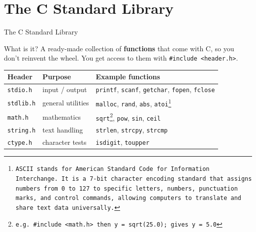 \documentclass[aspectratio=169]{beamer}
\begin{document}
	\section{The C Standard Library}
	\begin{frame}{The C Standard Library}
		\vspace*{-0.3cm}
		\begin{block}{What is it?}
			A ready-made collection of \textbf{functions} that come with C, so you don't reinvent the wheel.
			You get access to them with \texttt{\#include <header.h>}.
		\end{block}
		\renewcommand{\arraystretch}{1.2}
		\centering
		\begin{tabular}{@{}llp{6.9cm}@{}}
			\toprule
			\textbf{Header} & \textbf{Purpose} & \textbf{Example functions} \\
			\midrule
			\texttt{stdio.h}  & input / output      & \texttt{printf}, \texttt{scanf}, \texttt{getchar}, \texttt{fopen}, \texttt{fclose} \\
			\texttt{stdlib.h} & general utilities   & \texttt{malloc}, \texttt{rand}, \texttt{abs}, \texttt{atoi\footnote{ASCII stands for American Standard Code for Information Interchange. It is a 7-bit character encoding standard that assigns numbers from 0 to 127 to specific letters, numbers, punctuation marks, and control commands, allowing computers to translate and share text data universally.}} \\
			\texttt{math.h}   & mathematics         & \texttt{sqrt\footnote{e.g.\ \texttt{\#include <math.h>} then \texttt{y = sqrt(25.0);} gives \texttt{y = 5.0}}}, \texttt{pow}, \texttt{sin}, \texttt{ceil} \\
			\texttt{string.h} & text handling       & \texttt{strlen}, \texttt{strcpy}, \texttt{strcmp} \\
			\texttt{ctype.h}  & character tests     & \texttt{isdigit}, \texttt{toupper} \\
			\bottomrule
		\end{tabular}
	\end{frame}
	
\end{document}
